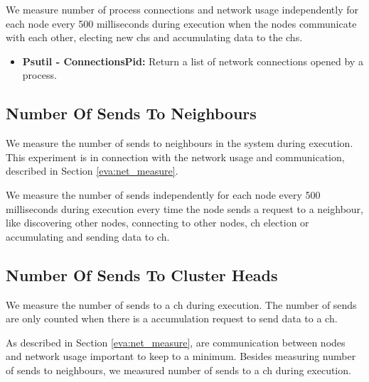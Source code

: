 \documentclass[USenglish]{uit-thesis}
\begin{document}
We measure number of process connections and network usage independently for each node every 500 milliseconds during execution when the nodes communicate with each other, electing new \glspl{ch} and accumulating data to the \glspl{ch}.

\begin{itemize}
\item \textbf{Psutil - ConnectionsPid:} Return a list of network connections opened by a process.
\end{itemize}



\subsection{Number Of Sends To Neighbours} \label{eva:num_sends}
We measure the number of sends to neighbours in the system during execution. This experiment is in connection with the network usage and communication, described in Section \ref{eva:net_measure}. 

We measure the number of sends independently for each node every 500 milliseconds during execution every time the node sends a request to a neighbour, like discovering other nodes, connecting to other nodes, \gls{ch} election or accumulating and sending data to \gls{ch}.


\subsection{Number Of Sends To Cluster Heads} \label{eva:num_sends_ch}
We measure the number of sends to a \gls{ch} during execution. The number of sends are only counted when there is a accumulation request to send data to a \gls{ch}.

As described in Section \ref{eva:net_measure}, are communication between nodes and network usage important to keep to a minimum. Besides measuring number of sends to neighbours, we measured number of sends to a \gls{ch} during execution. 
\end{document}

